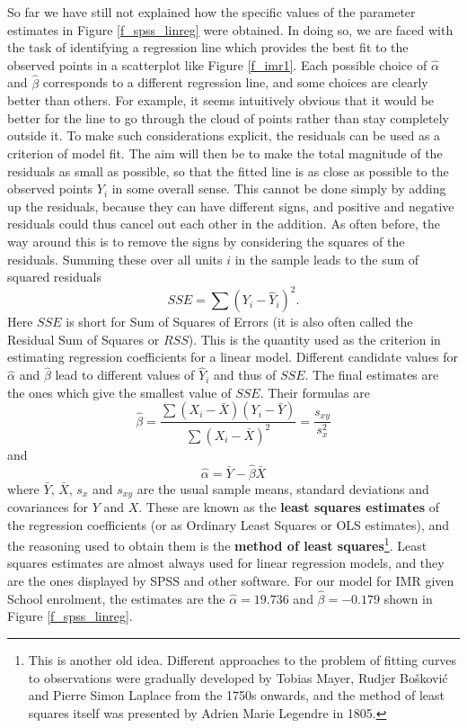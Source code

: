 So far we have still not explained how the specific values of the
parameter estimates in Figure \ref{f_spss_linreg} were obtained. In
doing so, we are faced with the task of identifying a regression line
which provides the best fit to the observed points in a scatterplot like
Figure \ref{f_imr1}. Each possible choice of $\hat{\alpha}$ and
$\hat{\beta}$ corresponds to a different regression line, and some
choices are clearly better than others. For example, it seems
intuitively obvious that it would be better for the line to go through
the cloud of points rather than stay completely outside it. To make such
considerations explicit, the residuals can be used as a criterion of
model fit. The aim will then be to make the total magnitude of the
residuals as small as possible, so that the fitted line is as close as
possible to the observed points $Y_{i}$ in some overall sense. This
cannot be done simply by adding up the residuals, because they can have
different signs, and positive and negative residuals could thus cancel
out each other in the addition. As often before, the way around this is
to remove the signs by considering the squares of the residuals. Summing
these over all units $i$ in the sample leads to the sum of squared residuals
\[
SSE = \sum (Y_{i}-\hat{Y}_{i})^{2}.
\]
Here $SSE$ is short for Sum of Squares of Errors (it is also
often called the Residual Sum of Squares or $RSS$). This is the quantity
used as the criterion in estimating regression coefficients for a linear
model. Different candidate values for $\hat{\alpha}$ and $\hat{\beta}$
lead to different values of $\hat{Y}_{i}$ and thus of $SSE$. The
final estimates are the ones which give the
smallest value of $SSE$. Their formulas are
\begin{equation}
\hat{\beta}=
\frac{
\sum (X_{i}-\bar{X})(Y_{i}-\bar{Y})}
{\sum (X_{i}-\bar{X})^{2}}
=\frac{s_{xy}}{s_{x}^{2}}
\label{ols_b}
\end{equation}
and
\begin{equation}
\hat{\alpha}=\bar{Y}-\hat{\beta}\bar{X}
\label{ols_a}
\end{equation}
where $\bar{Y}$, $\bar{X}$, $s_{x}$ and $s_{xy}$ are the usual sample
means, standard deviations and covariances for $Y$ and $X$. These are
known as the \textbf{least squares estimates} of the regression
coefficients (or as Ordinary Least Squares or OLS estimates), and the
reasoning used to obtain them is the \textbf{method of least
squares}\footnote{This is another old idea. Different
approaches to the problem of fitting curves to observations were
gradually developed by Tobias Mayer, Rudjer Bo\v{s}kovi\'{c} and Pierre
Simon Laplace from the 1750s onwards, and the method of least squares
itself was presented by Adrien Marie Legendre in 1805.}. Least squares
estimates are almost always used for linear regression models, and they
are the ones displayed by SPSS and other software. For our model for IMR
given School enrolment, the estimates are the $\hat{\alpha}=19.736$ and
$\hat{\beta}=-0.179$ shown in Figure \ref{f_spss_linreg}.

